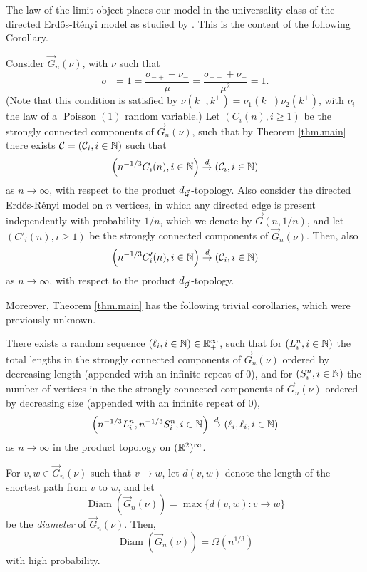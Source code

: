 The law of the limit object places our model in the universality class of the directed Erd\H{o}s-Rényi model as studied by \citet{goldschmidtScalingLimitCritical2019}. This is the content of the following Corollary.
\begin{corollary}
Consider $\vec{G}_n(\nu)$, with $\nu$ such that $$\sigma_+=1=\frac{\sigma_{-+}+\nu_-}{\mu}=\frac{\sigma_{-+}+\nu_-}{\mu^2}=1.$$ (Note that this condition is satisfied by $\nu(k^-,k^+)=\nu_1(k^-)\nu_2(k^+)$, with $\nu_i$ the law of a $\operatorname{Poisson}(1)$ random variable.)
Let $(C_i(n), i\geq 1)$ be the strongly connected components of $\vec{G}_n(\nu)$, such that by Theorem \ref{thm.main} there exists ${\mathcal C}=({\mathcal C}_i,i\in {\mathbb N})$ such that 
$$\left(n^{-1/3}C_i(n),i\in {\mathbb N}\right)\overset{d}{\to}\left({\mathcal C}_i,i\in {\mathbb N}\right)$$
as $n\to \infty$, with respect to the product $d_{\vec{{\mathcal G}}}$-topology. Also consider the directed Erd\H{o}s-R\'enyi model on $n$ vertices, in which any directed edge is present independently with probability $1/n$, which we denote by $\vec{G}(n,1/n)$, and let $(C'_i(n), i\geq 1)$ be the strongly connected components of $\vec{G}_n(\nu)$. Then, also
$$\left(n^{-1/3}C'_i(n),i\in {\mathbb N}\right)\overset{d}{\to}\left({\mathcal C}_i,i\in {\mathbb N}\right)$$
as $n\to \infty$, with respect to the product $d_{\vec{{\mathcal G}}}$-topology. 
\end{corollary}
Moreover, Theorem \ref{thm.main} has the following trivial corollaries, which were previously unknown. 
\begin{corollary}
There exists a random sequence $(\ell_i,i\in {\mathbb N})\in {\mathbb R}_+^\infty$, such that for $(L^n_i,i\in {\mathbb N})$ the total lengths in the strongly connected components of $\vec{G}_n(\nu)$ ordered by decreasing length (appended with an infinite repeat of $0$), and for $(S^n_i,i\in{\mathbb N})$ the number of vertices in the the strongly connected components of $\vec{G}_n(\nu)$ ordered by decreasing size (appended with an infinite repeat of $0$),
$$\left(n^{-1/3}L^n_i,n^{-1/3}S^n_i, i\in {\mathbb N}\right)\overset{d}{\to}\left(\ell_i,\ell_i,i\in {\mathbb N}\right)$$
as $n\to \infty$ in the product topology on $({\mathbb R}^2)^\infty$. 
\end{corollary}
\begin{corollary}
For $v,w\in \vec{G}_n(\nu)$ such that $v\to w$, let $d(v,w)$ denote the length of the shortest path from $v$ to $w$, and let $$\operatorname{Diam}\left(\vec{G}_n(\nu)\right)=\max\{d(v,w):v\to w\}$$ be the \emph{diameter} of $\vec{G}_n(\nu)$. Then,  $$\operatorname{Diam}\left(\vec{G}_n(\nu)\right)=\Omega(n^{1/3})$$
with high probability.
\end{corollary}


